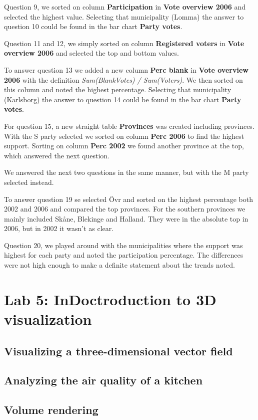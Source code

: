 \documentclass[a4paper]{article}
\begin{document}
Question 9, we sorted on column \textbf{Participation} in \textbf{Vote overview 2006} and selected the highest value. Selecting that municipality (Lomma) the answer to question 10 could be found in the bar chart \textbf{Party votes}.

Question 11 and 12, we simply sorted on column \textbf{Registered voters} in \textbf{Vote overview 2006} and selected the top and bottom values.

To answer question 13 we added a new column \textbf{Perc blank} in \textbf{Vote overview 2006} with the definition \textit{Sum(BlankVotes) / Sum(Voters)}. We then sorted on this column and noted the highest percentage. Selecting that municipality (Karlsborg) the answer to question 14 could be found in the bar chart \textbf{Party votes}.

For question 15, a new straight table \textbf{Provinces} was created including provinces. With the S party selected we sorted on column \textbf{Perc 2006} to find the highest support. Sorting on column \textbf{Perc 2002} we found another province at the top, which answered the next question.

We answered the next two questions in the same manner, but with the M party selected instead.

To answer question 19 se selected \"Ovr and sorted on the highest percentage both 2002 and 2006 and compared the top provinces. For the southern provinces we mainly included Sk\aa ne, Blekinge and Halland. They were in the absolute top in 2006, but in 2002 it wasn't as clear. 

Question 20, we played around with the municipalities where the support was highest for each party and noted the participation percentage. The differences were not high enough to make a definite statement about the trends noted.

\section{Lab 5: InDoctroduction to 3D visualization}

\subsection{Visualizing a three-dimensional vector field}

\subsection{Analyzing the air quality of a kitchen}

\subsection{Volume rendering}
\end{document}
